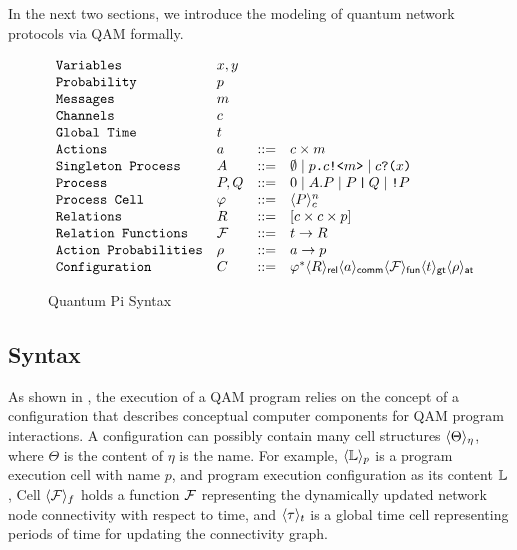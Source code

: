 In the next two sections, we introduce the modeling of quantum network protocols via QAM formally.

\begin{figure}[t]
{\small
  \[\begin{array}{llcl} 
      \texttt{Variables} & x,y \\
      \texttt{Probability} & p\\
      \texttt{Messages} & m\\
    \texttt{Channels} & c\\
    \texttt{Global Time} & t\\
    \texttt{Actions} & a & ::= & c \times m\\
      \texttt{Singleton Process} & A & ::= & \emptyset \mid p\texttt{.}c\texttt{!<}m\texttt{>} \mid c\texttt{?(}x\texttt{)} \\
      \texttt{Process} & P,Q & ::= & 0 \mid A.P \mid P\,\texttt{|}\,Q \mid \texttt{!}P \\
      \texttt{Process Cell} & \varphi & ::= & \langle P \rangle^{n}_{c} \\
      \texttt{Relations} & R & ::= & [c \times c \times p] \\
      \texttt{Relation Functions} & \mathcal{F} & ::= & t \to R\\
    \texttt{Action Probabilities} & \rho & ::=& a \to p\\
      \texttt{Configuration} & C & ::= & \varphi^* \langle R \rangle_{\textsf{rel}}\langle a \rangle_{\textsf{comm}}\langle \mathcal{F} \rangle_{\textsf{fun}}\langle t \rangle_{\textsf{gt}}\langle \rho \rangle_{\textsf{at}}
    \end{array}
  \]
}
\caption{Quantum Pi Syntax}
  \label{fig:q-pi-syntax}
\end{figure}


\subsection{Syntax} \label{sec:qamsyntax}

As shown in , the execution of a QAM program relies on the concept of 
a configuration that describes conceptual computer components for QAM program interactions.
A configuration can possibly contain many cell structures $\langle \Theta \rangle_{\eta}$, where $\Theta$ is the content of $\eta$ is the name.
For example, $\langle \mathbb{L} \rangle_{p}$ is a program execution cell with name $p$, and program execution configuration as its content $\mathbb{L}$,
Cell $\langle \mathcal{F} \rangle_{f}$ holds a function $\mathcal{F}$ representing the dynamically updated network node connectivity with respect to time, and $\langle \tau \rangle_{t}$ is a global time cell representing periods of time for updating the connectivity graph.

